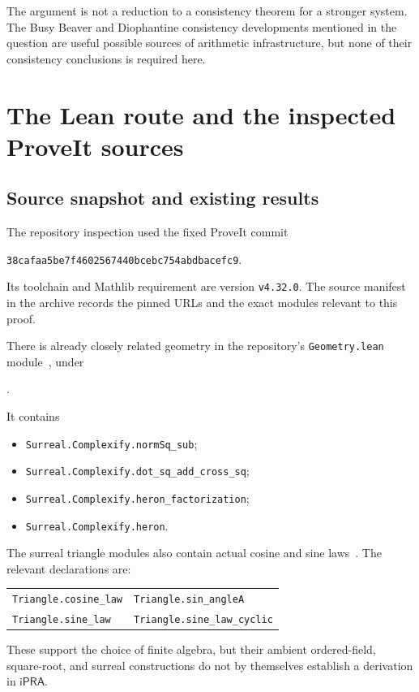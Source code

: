 \documentclass[11pt,a4paper]{article}
\theoremstyle{definition}
\newcommand{\ipra}{\mathsf{iPRA}}
\newcommand{\code}[1]{\texttt{\small #1}}
\numberwithin{equation}{section}
\begin{document}
The argument is not a reduction to a consistency theorem for a
stronger system. The Busy Beaver and Diophantine consistency
developments mentioned in the question are useful possible sources
of arithmetic infrastructure, but none of their consistency
conclusions is required here.

\section{The Lean route and the inspected ProveIt sources}
\label{sec:lean}

\subsection{Source snapshot and existing results}

The repository inspection used the fixed ProveIt commit
\begin{center}
\code{38cafaa5be7f4602567440bcebc754abdbacefc9}.
\end{center}
Its toolchain and Mathlib requirement are version \code{v4.32.0}.
The source manifest in the archive records the pinned URLs and
the exact modules relevant to this proof.

There is already closely related geometry in the repository's
\code{Geometry.lean} module~\cite{geometry-source}, under
\begin{center}\small
{}.
\end{center}
It contains
\begin{itemize}
\item \code{Surreal.Complexify.normSq\_sub};
\item \code{Surreal.Complexify.dot\_sq\_add\_cross\_sq};
\item \code{Surreal.Complexify.heron\_factorization};
\item \code{Surreal.Complexify.heron}.
\end{itemize}
The surreal triangle modules also contain actual cosine and sine
laws~\cite{triangle-source}. The relevant declarations are:
\begin{center}
\begin{tabular}{ll}
\code{Triangle.cosine\_law} & \code{Triangle.sin\_angleA}\\
\code{Triangle.sine\_law} & \code{Triangle.sine\_law\_cyclic}
\end{tabular}
\end{center}
These support the choice of finite algebra, but their ambient
ordered-field, square-root, and surreal constructions do not by
themselves establish a derivation in \(\ipra\).
\end{document}
